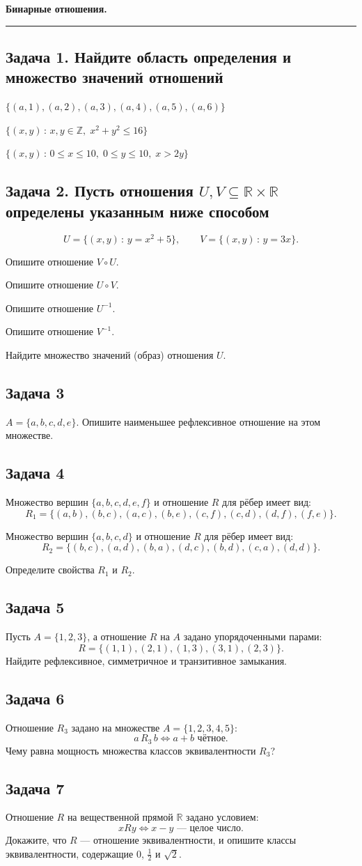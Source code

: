 \documentclass[a4paper,12pt,oneside]{article}
\newcommand{\Task}[1]{%
  \subsection*{Задача #1}%
  \vspace{-0.2\baselineskip}%
}
\begin{document}
\begin{center}
    {\Large\bfseries Бинарные отношения.}\\[2mm]
\end{center}
\vspace{2mm}
\hrule
\vspace{4mm}

\Task{1. Найдите область определения и множество значений отношений}
\begin{alphlist}
  \item $\bigl\{(a,1),(a,2),(a,3),(a,4),(a,5),(a,6)\bigr\}$
  \item $\bigl\{(x,y)\,:\,x,y\in\mathbb{Z},\;x^2+y^2\le 16\bigr\}$
  \item $\bigl\{(x,y)\,:\,0\le x\le 10,\;0\le y\le 10,\;x>2y\bigr\}$
\end{alphlist}

\Task{2. Пусть отношения $U, V \subseteq \mathbb{R}\times\mathbb{R}$ определены указанным ниже способом}
\[
U=\bigl\{(x,y)\,:\,y=x^2+5\bigr\},
\qquad
V=\bigl\{(x,y)\,:\,y=3x\bigr\}.
\]
\begin{alphlist}
  \item Опишите отношение $V\circ U$.
  \item Опишите отношение $U\circ V$.
  \item Опишите отношение $U^{-1}$.
  \item Опишите отношение $V^{-1}$.
  \item Найдите множество значений (образ) отношения $U$.
\end{alphlist}

\Task{3}
$A=\{a,b,c,d,e\}$. Опишите наименьшее рефлексивное отношение на этом множестве.

\Task{4}
\begin{numlist}
  \item Множество вершин $\{a,b,c,d,e,f\}$ и отношение $R$ для рёбер имеет вид:
  \[
    R_1=\bigl\{(a,b),(b,c),(a,c),(b,e),(c,f),(c,d),(d,f),(f,e)\bigr\}.
  \]

  \item Множество вершин $\{a,b,c,d\}$ и отношение $R$ для рёбер имеет вид:
  \[
    R_2=\bigl\{(b,c),(a,d),(b,a),(d,c),(b,d),(c,a),(d,d)\bigr\}.
  \]

  \item Определите свойства $R_1$ и $R_2$.
\end{numlist}

\Task{5}
Пусть $A=\{1,2,3\}$, а отношение $R$ на $A$ задано упорядоченными парами:
\[
R=\bigl\{(1,1),(2,1),(1,3),(3,1),(2,3)\bigr\}.
\]
Найдите рефлексивное, симметричное и транзитивное замыкания.

\Task{6}
Отношение $R_3$ задано на множестве $A=\{1,2,3,4,5\}$:
\[
a\,R_3\,b \iff a+b \text{ чётное}.
\]
Чему равна мощность множества классов эквивалентности $R_3$?

\Task{7}
Отношение $R$ на вещественной прямой $\mathbb{R}$ задано условием:
\[
xRy \iff x-y \text{ — целое число}.
\]
Докажите, что $R$ — отношение эквивалентности, и опишите классы эквивалентности,
содержащие $0$, $\tfrac{1}{2}$ и $\sqrt{2}$.
\end{document}
